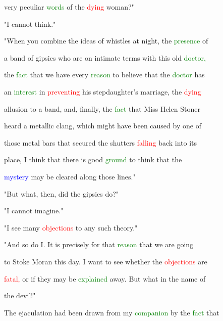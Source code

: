  very peculiar \textcolor{green}{words} of the \textcolor{red}{dying} woman?"



 "I cannot think."



 "When you combine the ideas of whistles at night, the \textcolor{green}{presence} of

 a band of gipsies who are on \textcolor{BurntOrange}{intimate} terms with this old \textcolor{green}{doctor,}

 the \textcolor{green}{fact} that we have every \textcolor{green}{reason} to believe that the \textcolor{green}{doctor} has

 an \textcolor{green}{interest} in \textcolor{red}{preventing} his stepdaughter's \textcolor{BurntOrange}{marriage,} the \textcolor{red}{dying}

 allusion to a band, and, \textcolor{BurntOrange}{finally,} the \textcolor{green}{fact} that Miss Helen Stoner

 heard a metallic clang, which might have been caused by one of

 those metal bars that secured the shutters \textcolor{red}{falling} back into its

 place, I think that there is \textcolor{BurntOrange}{good} \textcolor{green}{ground} to think that the

 \textcolor{blue}{mystery} may be cleared along those lines."



 "But what, then, did the gipsies do?"



 "I cannot imagine."



 "I see many \textcolor{red}{objections} to any such \textcolor{BurntOrange}{theory."}



 "And so do I. It is precisely for that \textcolor{green}{reason} that we are going

 to Stoke Moran this day. I want to see whether the \textcolor{red}{objections} are

 \textcolor{red}{fatal,} or if they may be \textcolor{green}{explained} away. But what in the name of

 the \textcolor{BurntOrange}{devil!"}



 The \textcolor{BurntOrange}{ejaculation} had been drawn from my \textcolor{green}{companion} by the \textcolor{green}{fact} that

